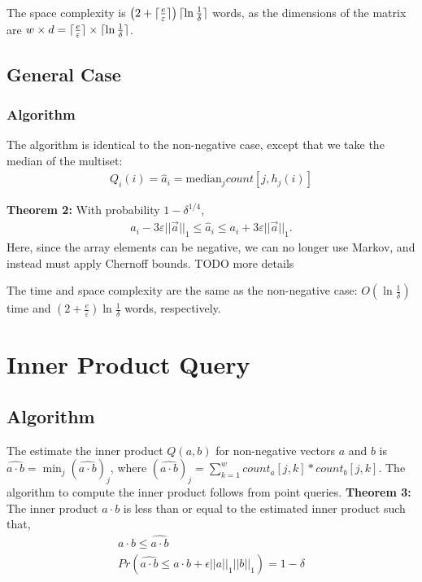 \documentclass[11pt]{article}
\newcommand{\comment}[1]{}
\newcommand{\sq}{\mathit{Q}_i}
\DeclarePairedDelimiter\ceil{\lceil}{\rceil}
\begin{document}
The space complexity is $\left(2 + \ceil{\frac{e}{\varepsilon}}\right)\ceil{\ln \frac{1}{\delta}}$ words, as the dimensions of the matrix are 
$w \times d = \ceil{\frac{e}{\varepsilon}}\times\ceil{\ln \frac{1}{\delta}}$.

\comment{All previous analyses of sketch algorithm use Chebyshev in their estimation analysis, yielding a dependency on
$\frac{1}{\epsilon^2}$ for the space complexity.  Using Markov in this analysis yields a tighter bound,
with a dependency $\frac{1}{\epsilon}$.}

\subsection{General Case}
\subsubsection{Algorithm}
The algorithm is identical to the non-negative case, except that we take the median of the multiset:
\begin{align}
    \sq(i) = \hat{a}_i = \text{median}_j count[j, h_j(i)]
\end{align}

\textbf{Theorem 2:} With probability $1 - \delta^{1/4}$,
\begin{align}
    a_i - 3\varepsilon||\vec{a}||_1 \leq \hat{a}_i \leq a_i + 3\varepsilon||\vec{a}||_1. 
\end{align}
Here, since the array elements can be negative, we can no longer use Markov, and instead must apply Chernoff
bounds. TODO more details

The time and space complexity are the same as the non-negative case: $O(\ln
\frac{1}{\delta})$ time and $(2 + \frac{e}{\varepsilon})\ln \frac{1}{\delta}$
words, respectively. 

\section{Inner Product Query}
	\subsection{Algorithm}
		The estimate the inner product $\mathit{Q}(a,b)$ for non-negative vectors $a$ and $b$ is $\widehat{a \cdot b} = \min_j(\widehat{a \cdot b})_j$, where $(\widehat{a \cdot b})_j = \sum_{k=1}^w count_a[j,k] * count_b[j,k]$. The algorithm to compute the inner product follows from point queries.
		\textbf{Theorem 3:} The inner product $a \cdot b$ is less than or equal to the estimated inner product such that,
		\begin{align}
		a \cdot b \leq \widehat{a \cdot b} \\
		Pr(\widehat{a \cdot b} \leq a \cdot b + \epsilon||a||_1||b||_1) = 1-\delta
		\end{align}
\end{document}
